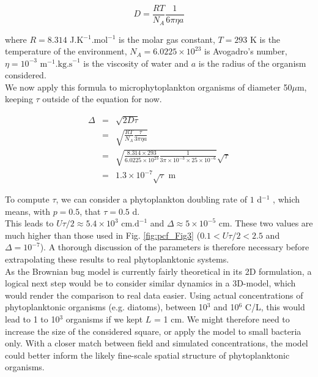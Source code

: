 \begin{equation}
 D=\frac{RT}{N_{A}}\frac{1}{6\pi\eta a}
\end{equation}

where $R=8.314$ J.K$^{-1}$.mol$^{-1}$ is the molar gas constant, $T=293$ K is the temperature of the environment, $N_{A}=6.0225\times10^{23}$ is Avogadro's number, $\eta=10^{-3}\text{ m}^{-1}.\text{kg.s}^{-1}$ is the viscosity of water and $a$ is the radius of the organism considered.\\

We now apply this formula to microphytoplankton organisms of diameter 50$\mu$m, keeping $\tau$ outside of the equation for now.

\begin{eqnarray}
\Delta & = & \sqrt{2D\tau}\\
  &= & \sqrt{\frac{RT}{N_{A}}\frac{\tau}{3\pi\eta a}}\\
&=& \sqrt{\frac{8.314\times293}{6.0225\times10^{23}}\frac{1}{3\pi\times10^{-3}\times25\times10^{-6}}}\sqrt{\tau}\\
 & = & 1.3 \times 10^{-7} \sqrt{\tau} \text{ m}
\end{eqnarray}

To compute $\tau$, we can consider a phytoplankton doubling rate of $1$ d$^{-1}$ \citep{bissinger_predicting_2008}, which means, with $p=0.5$, that $\tau=0.5$ d.\\

This leads to $U\tau/2\approx 5.4\times10^{3} \text{ cm.d}^{-1}$ and $\Delta \approx 5\times10^{-5}$ cm. These two values are much higher than those used in Fig. \ref{fig:pcf_Fig3} ($0.1<U\tau/2<2.5$ and $\Delta=10^{-7}$). A thorough discussion of the parameters is therefore necessary before extrapolating these results to real phytoplanktonic systems. \\

As the Brownian bug model is currently fairly theoretical in its 2D formulation, a logical next step would be to consider similar dynamics in a 3D-model, which would render the comparison to real data easier. Using actual concentrations of phytoplanktonic organisms (e.g. diatoms), between 10$^3$ and 10$^6$ C/L, this would lead to 1 to 10$^3$ organisms if we kept $L$ = 1 cm. We might therefore need to increase the size of the considered square, or apply the model to small bacteria only. With a closer match between field and simulated concentrations, the model could better inform the likely fine-scale spatial structure of phytoplanktonic organisms. 

